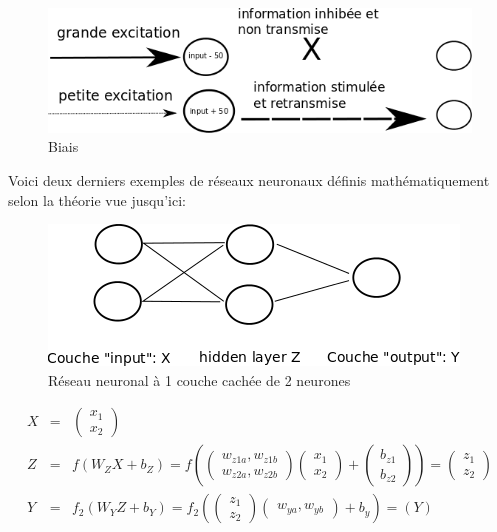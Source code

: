 \documentclass[11pt,a4paper]{report}
\begin{document}
    \begin{figure}[!h]
    \center
    \includegraphics[scale=0.74]{ressources/nn_theory_6.png}
    \caption{Biais}
    \end{figure} 
    

    \newpage
    \par Voici deux derniers exemples de réseaux neuronaux définis mathématiquement selon la théorie vue jusqu'ici: 
    
    \begin{figure}[!h]
    \center
    \includegraphics[scale=0.74]{ressources/nn_presentation_4.png}
    \caption{Réseau neuronal à 1 couche cachée de 2 neurones}
    \end{figure} 
    
    \begin{eqnarray}
    X &=& \begin{pmatrix} x_1 \\ x_2  \end{pmatrix}     \\
    Z &=& f\left(W_ZX+b_Z\right) = f\left(\begin{pmatrix} w_{z1a}, w_{z1b} \\ w_{z2a}, w_{z2b}\end{pmatrix}\begin{pmatrix} x_1 \\ x_2  \end{pmatrix}+\begin{pmatrix} b_{z1} \\ b_{z2}  \end{pmatrix}\right) =  \begin{pmatrix} z_1 \\ z_2  \end{pmatrix} \\
    Y &=& f_2\left( W_YZ+b_Y \right) = f_2\left( \begin{pmatrix} z_1 \\ z_2  \end{pmatrix} \begin{pmatrix} w_{ya} , w_{yb} \end{pmatrix} + b_y \right)  = (Y)
    \end{eqnarray}
    
\end{document}
